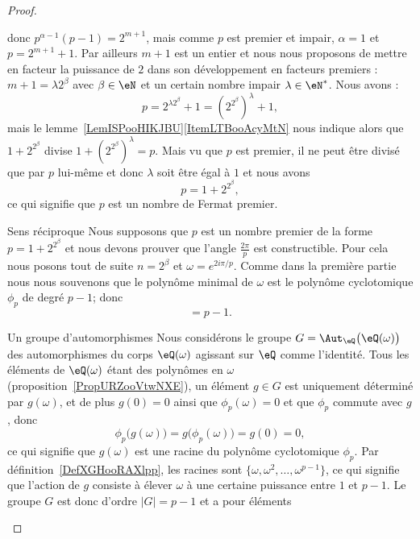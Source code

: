 \begin{proof}
\begin{subproof}
\begin{equation}
		\end{equation}
		donc \( p^{\alpha-1}(p-1)=2^{m+1}\), mais comme \( p\) est premier et impair, \( \alpha=1\) et \( p=2^{m+1}+1\). Par ailleurs \( m+1\) est un entier et nous nous proposons de mettre en facteur la puissance de \( 2\) dans son développement en facteurs premiers : \( m+1=\lambda 2^{\beta}\) avec \( \beta\in \eN\) et un certain nombre impair \( \lambda\in \eN^*\). Nous avons :
		\begin{equation}
			p=2^{\lambda 2^{\beta}}+1=\left( 2^{2^{\beta}} \right)^{\lambda}+1,
		\end{equation}
		mais le lemme~\ref{LemISPooHIKJBU}\ref{ItemLTBooAcyMtN} nous indique alors que \( 1+2^{2^{\beta}}\) divise \( 1+\left( 2^{2^{\beta}} \right)^{\lambda}=p\). Mais vu que \( p\) est premier, il ne peut être divisé que par \( p\) lui-même et donc \( \lambda\) soit être égal à \( 1\) et nous avons
		\begin{equation}
			p=1+2^{2^{\beta}},
		\end{equation}
		ce qui signifie que \( p\) est un nombre de Fermat premier.
		\item[Sens réciproque]
		Nous supposons que \( p\) est un nombre premier de la forme \( p=1+2^{2^{\beta}}\) et nous devons prouver que l'angle \( \frac{ 2\pi }{ p }\) est constructible. Pour cela nous posons tout de suite \( n=2^{\beta}\) et \( \omega= e^{2i\pi/p}\). Comme dans la première partie nous nous souvenons que le polynôme minimal de \( \omega\) est le polynôme cyclotomique \( \phi_p\) de degré \( p-1\); donc
		\begin{equation}
			[\eQ(\omega):\eQ]=p-1.
		\end{equation}
		\begin{subproof}
			\item[Un groupe d'automorphismes]
			Nous considérons le groupe \( G=\Aut_{\eQ}\big( \eQ(\omega) \big)\) des automorphismes du corps \( \eQ(\omega)\) agissant sur \( \eQ\) comme l'identité. Tous les éléments de \( \eQ(\omega)\) étant des polynômes en \( \omega\) (proposition~\ref{PropURZooVtwNXE}), un élément \( g\in G\) est uniquement déterminé par \( g(\omega)\), et de plus \( g(0)=0\) ainsi que \( \phi_p(\omega)=0\) et que \( \phi_p\) commute avec \( g\), donc
			\begin{equation}
				\phi_p\big( g(\omega) \big)=g\big( \phi_p(\omega) \big)=g(0)=0,
			\end{equation}
			ce qui signifie que \( g(\omega)\) est une racine du polynôme cyclotomique \( \phi_p\). Par définition~\ref{DefXGHooRAXlpp}, les racines sont \( \{ \omega,\omega^2,\ldots, \omega^{p-1} \}\), ce qui signifie que l'action de \( g\) consiste à élever \( \omega\) à une certaine puissance entre \( 1\) et \( p-1\). Le groupe \( G\) est donc d'ordre \( | G |=p-1\) et a pour éléments

\end{subproof}
\end{subproof}
\end{proof}
